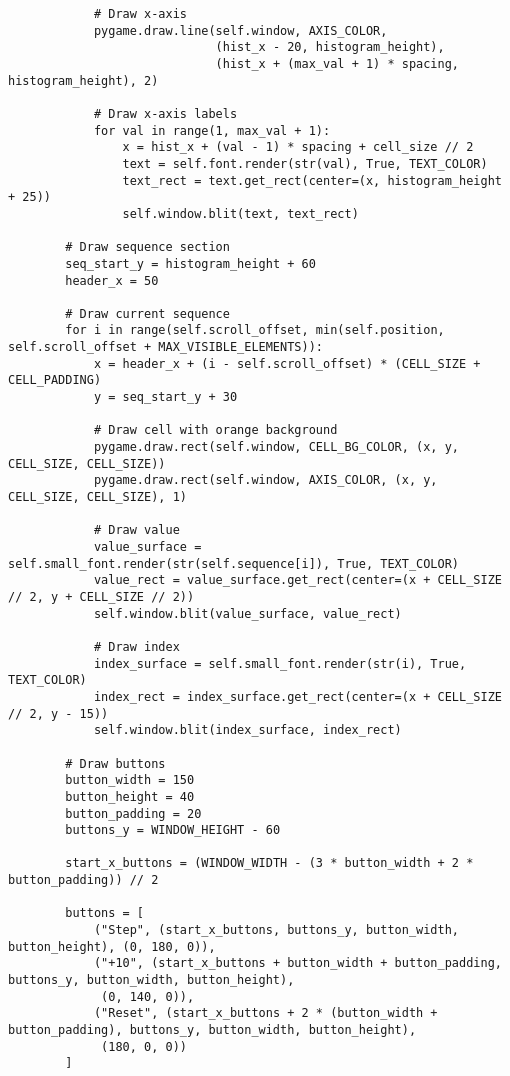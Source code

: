 \begin{lstlisting}
            # Draw x-axis
            pygame.draw.line(self.window, AXIS_COLOR,
                             (hist_x - 20, histogram_height),
                             (hist_x + (max_val + 1) * spacing, histogram_height), 2)

            # Draw x-axis labels
            for val in range(1, max_val + 1):
                x = hist_x + (val - 1) * spacing + cell_size // 2
                text = self.font.render(str(val), True, TEXT_COLOR)
                text_rect = text.get_rect(center=(x, histogram_height + 25))
                self.window.blit(text, text_rect)

        # Draw sequence section
        seq_start_y = histogram_height + 60
        header_x = 50

        # Draw current sequence
        for i in range(self.scroll_offset, min(self.position, self.scroll_offset + MAX_VISIBLE_ELEMENTS)):
            x = header_x + (i - self.scroll_offset) * (CELL_SIZE + CELL_PADDING)
            y = seq_start_y + 30

            # Draw cell with orange background
            pygame.draw.rect(self.window, CELL_BG_COLOR, (x, y, CELL_SIZE, CELL_SIZE))
            pygame.draw.rect(self.window, AXIS_COLOR, (x, y, CELL_SIZE, CELL_SIZE), 1)

            # Draw value
            value_surface = self.small_font.render(str(self.sequence[i]), True, TEXT_COLOR)
            value_rect = value_surface.get_rect(center=(x + CELL_SIZE // 2, y + CELL_SIZE // 2))
            self.window.blit(value_surface, value_rect)

            # Draw index
            index_surface = self.small_font.render(str(i), True, TEXT_COLOR)
            index_rect = index_surface.get_rect(center=(x + CELL_SIZE // 2, y - 15))
            self.window.blit(index_surface, index_rect)

        # Draw buttons
        button_width = 150
        button_height = 40
        button_padding = 20
        buttons_y = WINDOW_HEIGHT - 60

        start_x_buttons = (WINDOW_WIDTH - (3 * button_width + 2 * button_padding)) // 2

        buttons = [
            ("Step", (start_x_buttons, buttons_y, button_width, button_height), (0, 180, 0)),
            ("+10", (start_x_buttons + button_width + button_padding, buttons_y, button_width, button_height),
             (0, 140, 0)),
            ("Reset", (start_x_buttons + 2 * (button_width + button_padding), buttons_y, button_width, button_height),
             (180, 0, 0))
        ]


\end{lstlisting}
